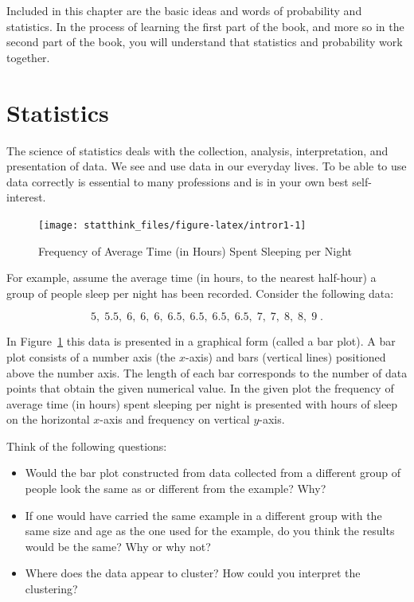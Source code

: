 \documentclass[
]{krantz}
\theoremstyle{definition}
\theoremstyle{definition}
\theoremstyle{definition}
\theoremstyle{remark}
\begin{document}
Included in this chapter are the basic ideas and words of probability and statistics. In the process of learning the first part of the book, and more so in the second part of the book, you will understand that statistics and probability work together.

\hypertarget{statistics}{%
\section{Statistics}\label{statistics}}

The science of statistics deals with the collection, analysis, interpretation, and presentation of data. We see and use data in our everyday lives. To be able to use data correctly is essential to many professions and is in your own best self-interest.

\begin{figure}

{\centering \texttt{[image: statthink\_files/figure-latex/intror1-1]} 

}

\caption{Frequency of Average Time (in Hours) Spent Sleeping per Night}\label{fig:intror1}
\end{figure}

For example, assume the average time (in hours, to the nearest half-hour) a group of people sleep per night has been recorded. Consider the following data:

\[5,\; 5.5,\; 6,\; 6,\; 6,\; 6.5,\; 6.5,\; 6.5,\; 6.5,\; 7,\; 7,\; 8,\; 8,\; 9\;.\]

In Figure~\ref{fig:intror1} this data is presented in a graphical form (called a bar plot). A bar plot consists of a number axis (the \(x\)-axis) and bars (vertical lines) positioned above the number axis. The length of each bar corresponds to the number of data points that obtain the given numerical value. In the given plot the frequency of average time (in hours) spent sleeping per night is presented with hours of sleep on the horizontal \(x\)-axis and frequency on vertical \(y\)-axis.

Think of the following questions:

\begin{itemize}
\item
  Would the bar plot constructed from data collected from a different group of people look the same as or different from the example? Why?
\item
  If one would have carried the same example in a different group with the same size and age as the one used for the example, do you think the results would be the same? Why or why not?
\item
  Where does the data appear to cluster? How could you interpret the clustering?
\end{itemize}
\end{document}
